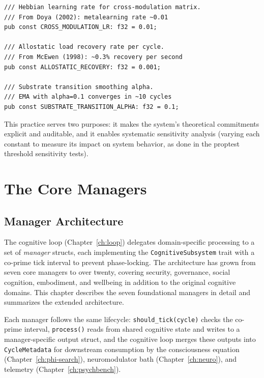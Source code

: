 \documentclass[12pt]{book}
\begin{document}
\begin{lstlisting}[caption={Named constants with scientific citations.},label=lst:thresholds]
/// Hebbian learning rate for cross-modulation matrix.
/// From Doya (2002): metalearning rate ~0.01
pub const CROSS_MODULATION_LR: f32 = 0.01;

/// Allostatic load recovery rate per cycle.
/// From McEwen (1998): ~0.3% recovery per second
pub const ALLOSTATIC_RECOVERY: f32 = 0.001;

/// Substrate transition smoothing alpha.
/// EMA with alpha=0.1 converges in ~10 cycles
pub const SUBSTRATE_TRANSITION_ALPHA: f32 = 0.1;
\end{lstlisting}

This practice serves two purposes: it makes the system's theoretical commitments explicit and auditable, and it enables systematic sensitivity analysis (varying each constant to measure its impact on system behavior, as done in the proptest threshold sensitivity tests).


\chapter{The Core Managers}
\label{ch:managers}

\section{Manager Architecture}

The cognitive loop (Chapter~\ref{ch:loop}) delegates domain-specific processing to a set of \textit{manager} structs, each implementing the \texttt{CognitiveSubsystem} trait with a co-prime tick interval to prevent phase-locking. The architecture has grown from seven core managers to over twenty, covering security, governance, social cognition, embodiment, and wellbeing in addition to the original cognitive domains. This chapter describes the seven foundational managers in detail and summarizes the extended architecture.

Each manager follows the same lifecycle: \texttt{should\_tick(cycle)} checks the co-prime interval, \texttt{process()} reads from shared cognitive state and writes to a manager-specific output struct, and the cognitive loop merges these outputs into \texttt{CycleMetadata} for downstream consumption by the consciousness equation (Chapter~\ref{ch:phi-search}), neuromodulator bath (Chapter~\ref{ch:neuro}), and telemetry (Chapter~\ref{ch:psychbench}).
\end{document}
